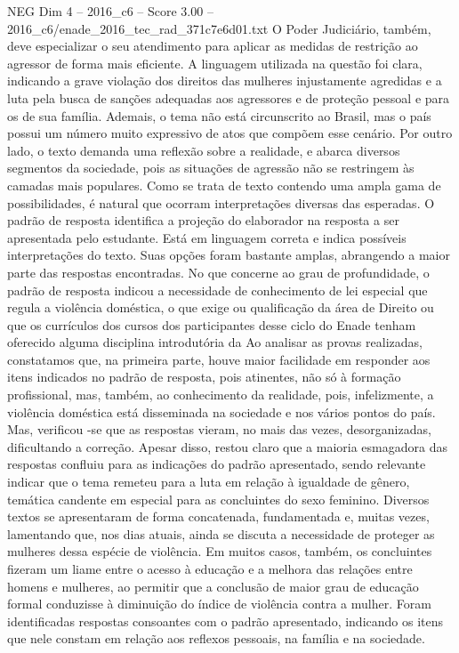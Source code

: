 \begin{textsample}{NEG Dim 4 – 2016\_c6 – Score 3.00 – 2016\_c6/enade\_2016\_tec\_rad\_371c7e6d01.txt}
O Poder Judiciário, também, deve especializar o seu atendimento para aplicar as medidas de restrição ao agressor de forma mais eficiente.
A linguagem utilizada na questão foi clara, indicando a grave violação dos direitos das mulheres injustamente agredidas e a luta pela busca de sanções adequadas aos agressores e de proteção pessoal e para os de sua família.
Ademais, o tema não está circunscrito ao Brasil, mas o país possui um número muito expressivo de atos que compõem esse cenário.
Por outro lado, o texto demanda uma reflexão sobre a realidade, e abarca diversos segmentos da sociedade, pois as situações de agressão não se restringem às camadas mais populares.
Como se trata de texto contendo uma ampla gama de possibilidades, é natural que ocorram interpretações diversas das esperadas.
O padrão de resposta identifica a projeção do elaborador na resposta a ser apresentada pelo estudante.
Está em linguagem correta e indica possíveis interpretações do texto.
Suas opções foram bastante amplas, abrangendo a maior parte das respostas encontradas.
No que concerne ao grau de profundidade, o padrão de resposta indicou a necessidade de conhecimento de lei especial que regula a violência doméstica, o que exige ou qualificação da área de Direito ou que os currículos dos cursos dos participantes desse ciclo do Enade tenham oferecido alguma disciplina introdutória da Ao analisar as provas realizadas, constatamos que, na primeira parte, houve maior facilidade em responder aos itens indicados no padrão de resposta, pois atinentes, não só à formação profissional, mas, também, ao conhecimento da realidade, pois, infelizmente, a violência doméstica está disseminada na sociedade e nos vários pontos do país.
Mas, verificou -se que as respostas vieram, no mais das vezes, desorganizadas, dificultando a correção.
Apesar disso, restou claro que a maioria esmagadora das respostas confluiu para as indicações do padrão apresentado, sendo relevante indicar que o tema remeteu para a luta em relação à igualdade de gênero, temática candente em especial para as concluintes do sexo feminino.
Diversos textos se apresentaram de forma concatenada, fundamentada e, muitas vezes, lamentando que, nos dias atuais, ainda se discuta a necessidade de proteger as mulheres dessa espécie de violência.
Em muitos casos, também, os concluintes fizeram um liame entre o acesso à educação e a melhora das relações entre homens e mulheres, ao permitir que a conclusão de maior grau de educação formal conduzisse à diminuição do índice de violência contra a mulher.
Foram identificadas respostas consoantes com o padrão apresentado, indicando os itens que nele constam em relação aos reflexos pessoais, na família e na sociedade.

\end{textsample}
